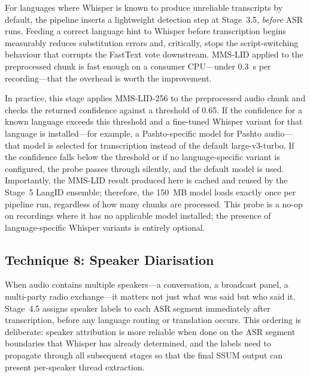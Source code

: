 \documentclass[12pt, onecolumn]{IEEEtran}
\begin{document}
For languages where Whisper is known to produce unreliable transcripts by default, the pipeline inserts a lightweight detection step at Stage~3.5, \textit{before} ASR runs. Feeding a correct language hint to Whisper before transcription begins measurably reduces substitution errors and, critically, stops the script-switching behaviour that corrupts the FastText vote downstream. MMS-LID applied to the preprocessed chunk is fast enough on a consumer CPU---under 0.3~s per recording---that the overhead is worth the improvement.

In practice, this stage applies MMS-LID-256 to the preprocessed audio chunk and checks the returned confidence against a threshold of 0.65. If the confidence for a known language exceeds this threshold and a fine-tuned Whisper variant for that language is installed---for example, a Pashto-specific model for Pashto audio---that model is selected for transcription instead of the default large-v3-turbo. If the confidence falls below the threshold or if no language-specific variant is configured, the probe passes through silently, and the default model is used. Importantly, the MMS-LID result produced here is cached and reused by the Stage~5 LangID ensemble; therefore, the 150~MB model loads exactly once per pipeline run, regardless of how many chunks are processed. This probe is a no-op on recordings where it has no applicable model installed; the presence of language-specific Whisper variants is entirely optional.

\subsection{Technique 8: Speaker Diarisation}
\label{sec:diar}

When audio contains multiple speakers---a conversation, a broadcast panel, a multi-party radio exchange---it matters not just what was said but who said it. Stage~4.5 assigns speaker labels to each ASR segment immediately after transcription, before any language routing or translation occurs. This ordering is deliberate: speaker attribution is more reliable when done on the ASR segment boundaries that Whisper has already determined, and the labels need to propagate through all subsequent stages so that the final SSUM output can present per-speaker thread extraction.
\end{document}
